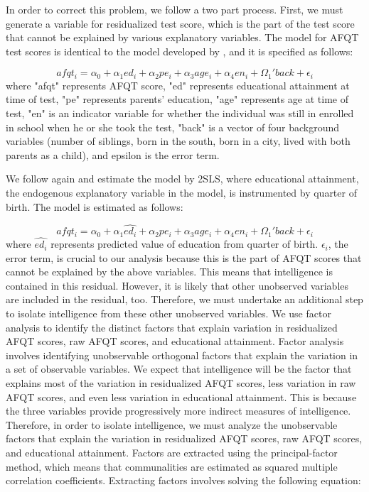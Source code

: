 \documentclass[12pt]{report}
\newcommand{\beq}{\begin{equation}}
\newcommand{\eeq}{\end{equation}}
\newcommand{\citee}[1]{\citename{#1} \citeyear{#1}}
\begin{document}
In order to correct this problem, we follow a two part process. First, we must generate a variable for residualized test score, which is the part of the test score that cannot be explained by various explanatory variables. The model for AFQT test scores is identical to the model developed by \citee{HHM2003}, and it is specified as follows:

\beq afqt_i = \alpha_0 + \alpha_1 ed_i + \alpha_2 pe_i + \alpha_3 age_i + \alpha_4 en_i + \Omega_1'back + \epsilon_i\eeq
where "afqt" represents AFQT score, "ed" represents educational attainment at time of test, "pe" represents parents' education, "age" represents age at time of test, "en" is an indicator variable for whether the individual was still in enrolled in school when he or she took the test, "back" is a vector of four background variables (number of siblings, born in the south, born in a city, lived with both parents as a child), and epsilon is the error term.

We follow \citee{HHM2003} again and estimate the model by 2SLS, where educational attainment, the endogenous explanatory variable in the model, is instrumented by quarter of birth. The model is estimated as follows:

\beq afqt_i = \alpha_0 + \alpha_1 \hat{ed_i} + \alpha_2 pe_i + \alpha_3 age_i + \alpha_4 en_i + \Omega_1'back + \epsilon_i\eeq
where $\hat{ed_i}$ represents predicted value of education from quarter of birth. $\epsilon_i$, the error term, is crucial to our analysis because this is the part of AFQT scores that cannot be explained by the above variables. This means that intelligence is contained in this residual. However, it is likely that other unobserved variables are included in the residual, too. Therefore, we must undertake an additional step to isolate intelligence from these other unobserved variables. We use factor analysis to identify the distinct factors that explain variation in residualized AFQT scores, raw AFQT scores, and educational attainment. Factor analysis involves identifying unobservable orthogonal factors that explain the variation in a set of observable variables. We expect that intelligence will be the factor that explains most of the variation in residualized AFQT scores, less variation in raw AFQT scores, and even less variation in educational attainment. This is because the three variables provide progressively more indirect measures of intelligence. Therefore, in order to isolate intelligence, we must analyze the unobservable factors that explain the variation in residualized AFQT scores, raw AFQT scores, and educational attainment. Factors are extracted using the principal-factor method, which means that communalities are estimated as squared multiple correlation coefficients. Extracting factors involves solving the following equation:
\end{document}

